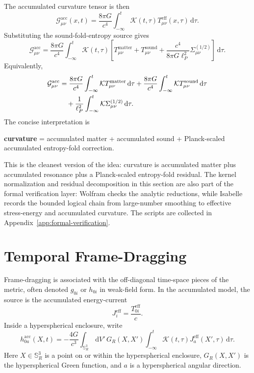 \documentclass[11pt,a4paper]{article}
\renewcommand{\boxed}[1]{#1}
\renewcommand{\fbox}[1]{#1}
\newcommand{\dd}{\,\mathrm{d}}
\newcommand{\Sph}{\mathbb{S}}
\newcommand{\Teff}{T_{\mu\nu}^{\mathrm{eff}}}
\newcommand{\Tmat}{T_{\mu\nu}^{\mathrm{matter}}}
\newcommand{\Tsound}{T_{\mu\nu}^{\mathrm{sound}}}
\newcommand{\Sigmahalf}{\Sigma_{\mu\nu}^{(1/2)}}
\begin{document}
The accumulated curvature tensor is then
\begin{equation}
\boxed{
\mathcal{G}_{\mu\nu}^{\mathrm{acc}}(x,t)
=
\frac{8\pi G}{c^4}
\int_{-\infty}^{t}\mathcal{K}(t,\tau)\Teff(x,\tau)\dd\tau.
}
\label{eq:g-acc}
\end{equation}
Substituting the sound-fold-entropy source gives
\begin{equation}
\boxed{
\mathcal{G}_{\mu\nu}^{\mathrm{acc}}
=
\frac{8\pi G}{c^4}
\int_{-\infty}^{t}\mathcal{K}(t,\tau)
\left[
\Tmat+
\Tsound+
\frac{c^4}{8\pi G\ell_P^2}\Sigmahalf
\right]\dd\tau.
}
\label{eq:g-acc-full}
\end{equation}
Equivalently,
\begin{align}
\boxed{
\mathcal{G}_{\mu\nu}^{\mathrm{acc}}
}&=\frac{8\pi G}{c^4}\int_{-\infty}^{t}\mathcal{K}\Tmat\dd\tau
+\frac{8\pi G}{c^4}\int_{-\infty}^{t}\mathcal{K}\Tsound\dd\tau
\notag\\
&\quad+\frac{1}{\ell_P^2}\int_{-\infty}^{t}\mathcal{K}\Sigmahalf\dd\tau.
\label{eq:g-acc-decomp}
\end{align}
The concise interpretation is
\begin{center}
\fbox{\begin{minipage}{0.88\linewidth}
\centering
\textbf{curvature}
= accumulated matter
+ accumulated sound
+ Planck-scaled accumulated entropy-fold correction.
\end{minipage}}
\end{center}
This is the cleanest version of the idea: curvature is accumulated matter plus accumulated resonance plus a Planck-scaled entropy-fold residual.
The kernel normalization and residual decomposition in this section are also part of the formal verification layer: Wolfram checks the analytic reductions, while Isabelle records the bounded logical chain from large-number smoothing to effective stress-energy and accumulated curvature. The scripts are collected in Appendix~\ref{app:formal-verification}.

\section{Temporal Frame-Dragging}

Frame-dragging is associated with the off-diagonal time-space pieces of the metric, often denoted $g_{0i}$ or $h_{0i}$ in weak-field form. In the accumulated model, the source is the accumulated energy-current
\begin{equation}
 J_i^{\mathrm{eff}}=\frac{T_{0i}^{\mathrm{eff}}}{c}.
\label{eq:j-eff}
\end{equation}
Inside a hyperspherical enclosure, write
\begin{equation}
\boxed{
 h_{0a}^{\mathrm{acc}}(X,t)
 =
 -\frac{4G}{c^3}
 \int_{\Sph_R^3}\dd V'\,G_R(X,X')
 \int_{-\infty}^{t}\mathcal{K}(t,\tau)J_a^{\mathrm{eff}}(X',\tau)\dd\tau.
}
\label{eq:frame-dragging}
\end{equation}
Here $X\in\Sph_R^3$ is a point on or within the hyperspherical enclosure, $G_R(X,X')$ is the hyperspherical Green function, and $a$ is a hyperspherical angular direction.
\end{document}
